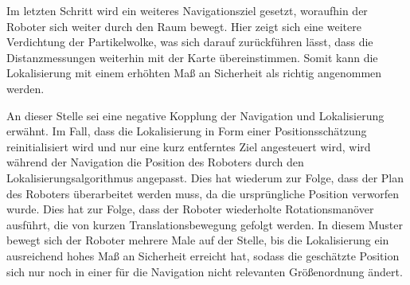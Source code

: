 Im letzten Schritt wird ein weiteres Navigationsziel gesetzt, woraufhin der Roboter sich weiter durch den Raum bewegt. Hier zeigt sich eine weitere Verdichtung der Partikelwolke, was sich darauf zurückführen lässt, dass die Distanzmessungen weiterhin mit der Karte übereinstimmen. Somit kann die Lokalisierung mit einem erhöhten Maß an Sicherheit als richtig angenommen werden.

An dieser Stelle sei eine negative Kopplung der Navigation und Lokalisierung erwähnt. Im Fall, dass die Lokalisierung in Form einer Positionsschätzung reinitialisiert wird und nur eine kurz entferntes Ziel angesteuert wird, wird während der Navigation die Position des Roboters durch den Lokalisierungsalgorithmus angepasst. Dies hat wiederum zur Folge, dass der Plan des Roboters überarbeitet werden muss, da die ursprüngliche Position verworfen wurde. Dies hat zur Folge, dass der Roboter wiederholte Rotationsmanöver ausführt, die von kurzen Translationsbewegung gefolgt werden. In diesem Muster bewegt sich der Roboter mehrere Male auf der Stelle, bis die Lokalisierung ein ausreichend hohes Maß an Sicherheit erreicht hat, sodass die geschätzte Position sich nur noch in einer für die Navigation nicht relevanten Größenordnung ändert.